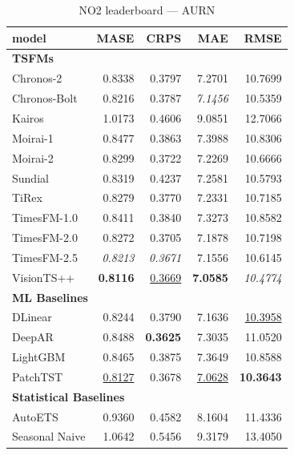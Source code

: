 \begin{table}[H]
\caption{NO2 leaderboard --- AURN}
\centering
\begin{small}
\begin{tabular}{lrrrr}
\toprule
model & MASE & CRPS & MAE & RMSE \\
\midrule
\multicolumn{5}{l}{\textbf{TSFMs}} \\
Chronos-2 & 0.8338 & 0.3797 & 7.2701 & 10.7699 \\
Chronos-Bolt & 0.8216 & 0.3787 & \textit{7.1456} & 10.5359 \\
Kairos & 1.0173 & 0.4606 & 9.0851 & 12.7066 \\
Moirai-1 & 0.8477 & 0.3863 & 7.3988 & 10.8306 \\
Moirai-2 & 0.8299 & 0.3722 & 7.2269 & 10.6666 \\
Sundial & 0.8319 & 0.4237 & 7.2581 & 10.5793 \\
TiRex & 0.8279 & 0.3770 & 7.2331 & 10.7185 \\
TimesFM-1.0 & 0.8411 & 0.3840 & 7.3273 & 10.8582 \\
TimesFM-2.0 & 0.8272 & 0.3705 & 7.1878 & 10.7198 \\
TimesFM-2.5 & \textit{0.8213} & \textit{0.3671} & 7.1556 & 10.6145 \\
VisionTS++ & \textbf{0.8116} & \underline{0.3669} & \textbf{7.0585} & \textit{10.4774} \\
\midrule
\multicolumn{5}{l}{\textbf{ML Baselines}} \\
DLinear & 0.8244 & 0.3790 & 7.1636 & \underline{10.3958} \\
DeepAR & 0.8488 & \textbf{0.3625} & 7.3035 & 11.0520 \\
LightGBM & 0.8465 & 0.3875 & 7.3649 & 10.8588 \\
PatchTST & \underline{0.8127} & 0.3678 & \underline{7.0628} & \textbf{10.3643} \\
\midrule
\multicolumn{5}{l}{\textbf{Statistical Baselines}} \\
AutoETS & 0.9360 & 0.4582 & 8.1604 & 11.4336 \\
Seasonal Naive & 1.0642 & 0.5456 & 9.3179 & 13.4050 \\
\bottomrule
\end{tabular}
\end{small}
\end{table}